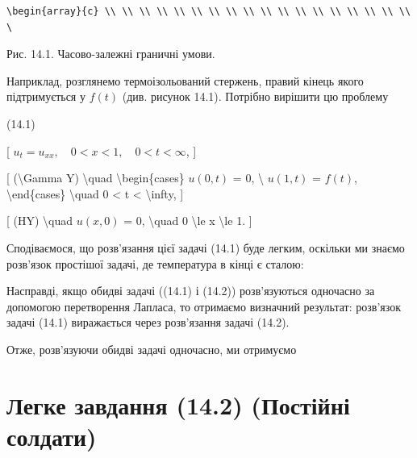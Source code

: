 \documentclass[
]{article}
\begin{document}
{{\begin{verbatim}
\begin{array}{c} \\ \\ \\ \\ \\ \\ \\ \\ \\ \\ \\ \\ \\ \\ \\ \\ \\ \\ \
\end{verbatim}

Рис. 14.1. Часово-залежні граничні умови.

Наприклад, розглянемо термоізольований стержень, правий кінець якого
підтримується у \(f(t)\) (див. рисунок 14.1). Потрібно вирішити цю
проблему

(14.1)

{[} \(u_{t} = u_{xx}, \quad 0 < x < 1, \quad 0 < t < \infty\), {]}

{[} (\textbackslash Gamma Y) \textbackslash quad
\textbackslash begin\{cases\} \(u(0, t)\) = 0, \textbackslash{}
\(u(1, t)\) = \(f(t)\), \textbackslash end\{cases\} \textbackslash quad
0 \textless{} t \textless{} \textbackslash infty, {]}

{[} (HY) \textbackslash quad \(u(x, 0)\) = 0, \textbackslash quad 0
\textbackslash le x \textbackslash le 1. {]}

Сподіваємося, що розв'язання цієї задачі (14.1) буде легким, оскільки ми
знаємо розв'язок простішої задачі, де температура в кінці є сталою:

Насправді, якщо обидві задачі ((14.1) і (14.2)) розв'язуються одночасно
за допомогою перетворення Лапласа, то отримаємо визначний результат:
розв'язок задачі (14.1) виражається через розв'язання задачі (14.2).

Отже, розв'язуючи обидві задачі одночасно, ми отримуємо

\section{Легке завдання (14.2) (Постійні
солдати)}\label{ux43bux435ux433ux43aux435-ux437ux430ux432ux434ux430ux43dux43dux44f-14.2-ux43fux43eux441ux442ux456ux439ux43dux456-ux441ux43eux43bux434ux430ux442ux438}

}}
\end{document}
